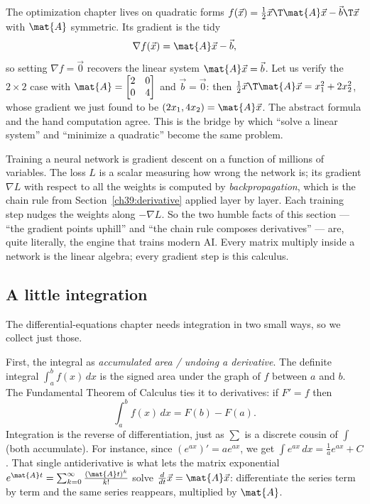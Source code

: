 \begin{example}
\label{ch39:ex-quadform}
The optimization chapter lives on quadratic forms $f(\vec{x}) = \tfrac12 \vec{x}\T\mat{A}\vec{x} -
\vec{b}\T\vec{x}$ with $\mat{A}$ symmetric. Its gradient is the tidy
\[
\nabla f(\vec{x}) = \mat{A}\vec{x} - \vec{b},
\]
so setting $\nabla f = \vec{0}$ recovers the linear system $\mat{A}\vec{x} = \vec{b}$. Let us verify
the $2\times2$ case with $\mat{A} = \begin{bmatrix}2 & 0\\ 0 & 4\end{bmatrix}$ and $\vec{b} =
\vec{0}$: then $\tfrac12\vec{x}\T\mat{A}\vec{x} = x_1^2 + 2x_2^2$, whose gradient we just found to be
$(2x_1, 4x_2) = \mat{A}\vec{x}$. The abstract formula and the hand computation agree. This is the
bridge by which ``solve a linear system'' and ``minimize a quadratic'' become the same problem.
\end{example}

\begin{applicationbox}
Training a neural network is gradient descent on a function of millions of variables. The loss $L$ is
a scalar measuring how wrong the network is; its gradient $\nabla L$ with respect to all the weights
is computed by \emph{backpropagation}, which is the chain rule from
Section~\ref{ch39:derivative} applied layer by layer. Each training step nudges the weights along
$-\nabla L$. So the two humble facts of this section --- ``the gradient points uphill'' and ``the
chain rule composes derivatives'' --- are, quite literally, the engine that trains modern AI. Every
matrix multiply inside a network is the linear algebra; every gradient step is this calculus.
\end{applicationbox}

\subsection{A little integration}
\label{ch39:integration}

The differential-equations chapter needs integration in two small ways, so we collect just those.

First, the integral as \emph{accumulated area / undoing a derivative}. The definite integral
$\int_a^b f(x)\,dx$ is the signed area under the graph of $f$ between $a$ and $b$. The Fundamental
Theorem of Calculus ties it to derivatives: if $F' = f$ then
\[
\int_a^b f(x)\,dx = F(b) - F(a).
\]
Integration is the reverse of differentiation, just as $\sum$ is a discrete cousin of $\int$ (both
accumulate). For instance, since $(e^{ax})' = a e^{ax}$, we get $\int e^{ax}\,dx = \frac1a e^{ax} +
C$. That single antiderivative is what lets the matrix exponential $e^{\mat{A}t} = \sum_{k=0}^\infty
\frac{(\mat{A}t)^k}{k!}$ solve $\frac{d}{dt}\vec{x} = \mat{A}\vec{x}$: differentiate the series term by
term and the same series reappears, multiplied by $\mat{A}$.


